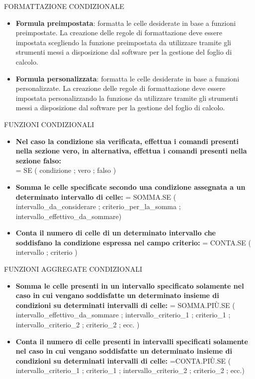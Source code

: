 \documentclass[aspectratio=1610]{beamer}
\begin{document}
\begin{frame}{FORMATTAZIONE CONDIZIONALE}
    \begin{itemize}
        \justifying
        \item \textbf{Formula preimpostata}: formatta le celle desiderate in base a 
        funzioni preimpostate. La creazione delle regole di formattazione deve 
        essere impostata scegliendo la funzione preimpostata da utilizzare 
        tramite gli strumenti messi a disposizione dal software per la 
        gestione del foglio di calcolo.
        \item \textbf{Formula personalizzata}: formatta le celle desiderate in base 
        a funzioni personalizzate. La creazione delle regole di formattazione 
        deve essere impostata personalizzando la funzione da utilizzare 
        tramite gli strumenti messi a disposizione dal software per la 
        gestione del foglio di calcolo.
    \end{itemize}
\end{frame}

\begin{frame}{FUNZIONI CONDIZIONALI}
    \begin{itemize}
        \justifying
        \item \textbf{Nel caso la condizione sia verificata, effettua i comandi 
        presenti nella sezione vero, in alternativa, effettua i comandi 
        presenti nella sezione falso:} \\
        = SE ( condizione ; vero ; falso )
        \item \textbf{Somma le celle specificate secondo una condizione assegnata a un determinato intervallo di celle:} 
        = SOMMA.SE ( intervallo\_da\_considerare ; criterio\_per\_la\_somma ; intervallo\_effettivo\_da\_sommare)
        \item \textbf{Conta il numero di celle di un determinato intervallo che soddisfano la condizione espressa nel campo criterio:} 
        = CONTA.SE ( intervallo ; criterio )
    \end{itemize}
\end{frame}

\begin{frame}{FUNZIONI AGGREGATE CONDIZIONALI}
    \begin{itemize}
        \justifying
        \item \textbf{Somma le celle presenti in un intervallo specificato solamente 
        nel caso in cui vengano soddisfatte un determinato insieme di 
        condizioni su determinati intervalli di celle:}  = SOMMA.PIÙ.SE ( intervallo\_effettivo\_da\_sommare ; 
        intervallo\_criterio\_1 ; criterio\_1 ; intervallo\_criterio\_2 ; criterio\_2 ; ecc. )
        \item \textbf{Conta il numero di celle presenti in intervalli specificati 
        solamente nel caso in cui vengano soddisfatte un determinato insieme 
        di condizioni su determinati intervalli di celle:} =CONTA.PIÙ.SE ( intervallo\_criterio\_1 ; 
        criterio\_1 ; intervallo\_criterio\_2 ; criterio\_2 ; ecc.)
    \end{itemize}
\end{frame}
\end{document}
